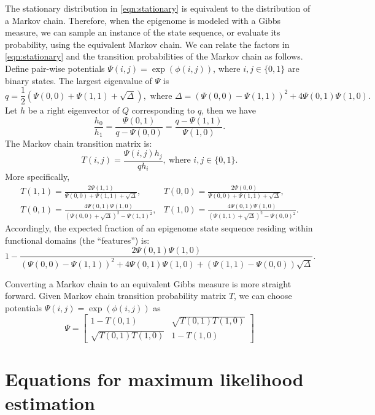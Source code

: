 \documentclass[11pt]{article}
\begin{document}
The stationary distribution in \eqref{eqn:stationary} is equivalent to
the distribution of a Markov chain. Therefore, when the epigenome is
modeled with a Gibbs measure, we can sample an instance of the state
sequence, or evaluate its probability, using the equivalent Markov
chain. We can relate the factors in \eqref{eqn:stationary} and the
transition probabilities of the Markov chain as follows. Define
pair-wise potentials $\Psi(i,j)=\exp(\phi(i, j))$, where $i, j\in\{0,1\}$
are binary states. The largest eigenvalue of $\Psi$ is
\[
q=\textstyle\frac{1}{2}\left(\Psi(0,0)+\Psi(1,1) +\sqrt{\Delta}\right), \text{ where }
\Delta=(\Psi(0,0) - \Psi(1,1))^2 + 4\Psi(0,1)\Psi(1,0).
\]
Let $h$ be a right eigenvector of $Q$ corresponding to $q$, then we have
\[
\frac{h_0}{h_1} = \frac{\Psi(0,1)}{q-\Psi(0,0)} = \frac{q-\Psi(1,1)}{\Psi(1,0)}.
\]
The Markov chain transition matrix is:
\[
T(i,j) = \frac{\Psi(i,j)h_j}{qh_{i}},~\text{where } i,j \in\{0,1\}.
\]
More specifically,
\begin{equation} \label{eqn:gibbs2markov}
  \begin{array}{ll}
    T(1,1) = \displaystyle\frac{2\Psi(1,1)}{\Psi(0,0)+\Psi(1,1)+\sqrt{\Delta}}, &
    T(0,0) = \displaystyle\frac{2\Psi(0,0)}{\Psi(0,0)+\Psi(1,1)+\sqrt{\Delta}}, \\[2em]
    T(0,1) = \displaystyle\frac{4\Psi(0,1)\Psi(1,0)}{(\Psi(0,0)+\sqrt{\Delta})^2 -\Psi(1,1)^2}, &
    T(1,0) = \displaystyle\frac{4\Psi(0,1)\Psi(1,0)}{(\Psi(1,1)+\sqrt{\Delta})^2 -\Psi(0,0)^2}.
  \end{array}
\end{equation}
Accordingly, the expected fraction of an epigenome state sequence
residing within functional domains (the ``features'') is:
\[
1- \frac{2\Psi(0,1)\Psi(1,0)}{(\Psi(0,0)-\Psi(1,1))^2 + 4\Psi(0,1)\Psi(1,0) +
  (\Psi(1,1)-\Psi(0,0))\sqrt{\Delta}}.
\]


Converting a Markov chain to an equivalent Gibbs measure is more
straight forward. Given Markov chain transition probability matrix
$T$, we can choose potentials $\Psi(i,j) = \exp(\phi(i,j))$ as
\[
\Psi =
 \begin{bmatrix}
   1 - T(0,1) & \sqrt{T(0,1)T(1,0)} \\
    \sqrt{T(0,1)T(1,0)} & 1-T(1,0)
 \end{bmatrix}
\]

\section{Equations for maximum likelihood estimation}
\end{document}
